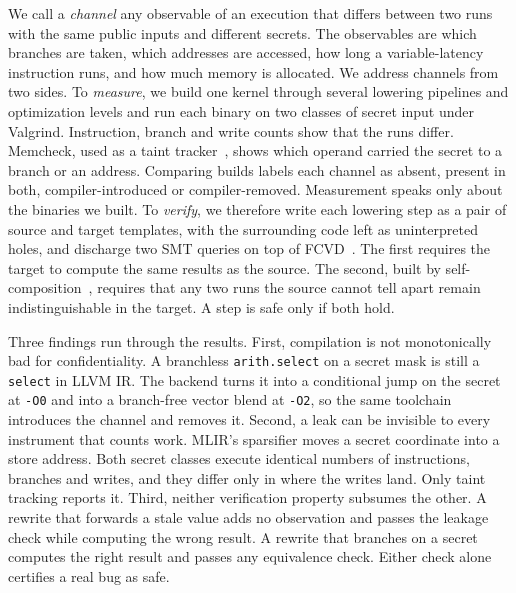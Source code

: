 We call a \emph{channel} any observable of an execution that differs
between two runs with the same public inputs and different secrets.
The observables are which branches are taken, which addresses are
accessed, how long a variable-latency instruction runs, and how much
memory is allocated. We address channels from two sides. To
\emph{measure}, we build one kernel through several lowering pipelines
and optimization levels and run each binary on two classes of secret
input under Valgrind. Instruction, branch and write counts show that
the runs differ. Memcheck, used as a taint tracker~\cite{langley2010ctgrind},
shows which operand carried the secret to a branch or an address.
Comparing builds labels each channel as absent, present in both,
compiler-introduced or compiler-removed. Measurement speaks only about
the binaries we built. To \emph{verify}, we therefore write each
lowering step as a pair of source and target templates, with the
surrounding code left as uninterpreted holes, and discharge two SMT
queries on top of FCVD~\cite{fcvd2025}. The first requires the
target to compute the same results as the source. The second, built by
self-composition~\cite{barthe2004selfcomposition},
requires that any two runs the source cannot tell apart remain
indistinguishable in the target. A step is safe only if both hold.

Three findings run through the results. First, compilation is not
monotonically bad for confidentiality. A branchless
\texttt{arith.select} on a secret mask is still a \texttt{select} in
LLVM IR. The backend turns it into a conditional jump on the secret at
\texttt{-O0} and into a branch-free vector blend at \texttt{-O2}, so
the same toolchain introduces the channel and removes it. Second, a
leak can be invisible to every instrument that counts work. MLIR's
sparsifier moves a secret coordinate into a store address. Both secret
classes execute identical numbers of instructions, branches and
writes, and they differ only in where the writes land. Only taint
tracking reports it. Third, neither verification property subsumes
the other. A rewrite that forwards a stale value adds no observation
and passes the leakage check while computing the wrong result. A
rewrite that branches on a secret computes the right result and passes
any equivalence check. Either check alone certifies a real bug as
safe.

